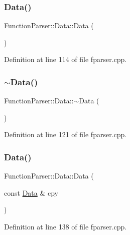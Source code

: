 \subsubsection{\texorpdfstring{Data()}{Data()}\hspace{0.1cm}{\footnotesize\ttfamily [1/2]}}
{\footnotesize\ttfamily Function\+Parser\+::\+Data\+::\+Data (\begin{DoxyParamCaption}{ }\end{DoxyParamCaption})}



Definition at line 114 of file fparser.\+cpp.

\mbox{\label{struct_function_parser_1_1_data_a1091c2cf47cbd047273335f913bb2f82}} 
\subsubsection{\texorpdfstring{$\sim$\+Data()}{~Data()}}
{\footnotesize\ttfamily Function\+Parser\+::\+Data\+::$\sim$\+Data (\begin{DoxyParamCaption}{ }\end{DoxyParamCaption})}



Definition at line 121 of file fparser.\+cpp.

\mbox{\label{struct_function_parser_1_1_data_a680226a014211a42b2186a3dc0da0292}} 
\subsubsection{\texorpdfstring{Data()}{Data()}\hspace{0.1cm}{\footnotesize\ttfamily [2/2]}}
{\footnotesize\ttfamily Function\+Parser\+::\+Data\+::\+Data (\begin{DoxyParamCaption}\item[{const \hyperlink{struct_function_parser_1_1_data}{Data} \&}]{cpy }\end{DoxyParamCaption})}



Definition at line 138 of file fparser.\+cpp.



